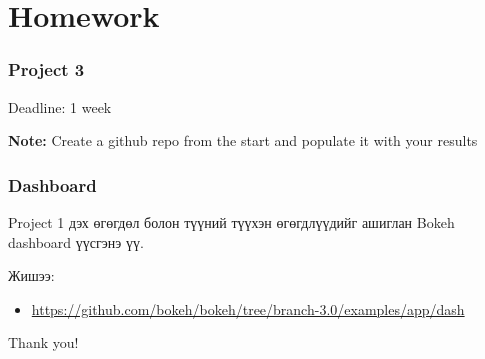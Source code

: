 \documentclass{beamer}
\begin{document}
\section{Homework} 

\begin{frame}
    \frametitle{Project 3}
\vskip 2mm
Deadline: 1 week %

\vfill
\textbf{Note:} Create a github repo from the start and populate it with your results
\end{frame}

\begin{frame}
    \frametitle{Dashboard}
    Project 1 дэх өгөгдөл болон түүний түүхэн өгөгдлүүдийг ашиглан Bokeh dashboard үүсгэнэ үү. 

    Жишээ: 

    \begin{itemize}
        \item \url{https://github.com/bokeh/bokeh/tree/branch-3.0/examples/app/dash}
    \end{itemize}
\end{frame}


\begin{frame}
\Huge{\centerline{Thank you!}}
\end{frame}

\end{document}

